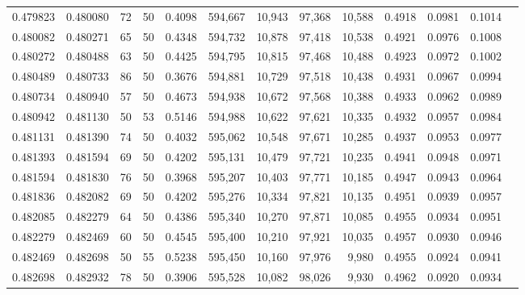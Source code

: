 \begin{tabular}{rrrrrrrrrrrrr}
0.479823 & 0.480080 &    72 &  50 &                                     0.4098 & 594,667 &  10,943 &  97,368 &  10,588 & 0.4918 & 0.0981 & 0.1014 \\
0.480082 & 0.480271 &    65 &  50 &                                     0.4348 & 594,732 &  10,878 &  97,418 &  10,538 & 0.4921 & 0.0976 & 0.1008 \\
0.480272 & 0.480488 &    63 &  50 &                                     0.4425 & 594,795 &  10,815 &  97,468 &  10,488 & 0.4923 & 0.0972 & 0.1002 \\
0.480489 & 0.480733 &    86 &  50 &                                     0.3676 & 594,881 &  10,729 &  97,518 &  10,438 & 0.4931 & 0.0967 & 0.0994 \\
0.480734 & 0.480940 &    57 &  50 &                                     0.4673 & 594,938 &  10,672 &  97,568 &  10,388 & 0.4933 & 0.0962 & 0.0989 \\
0.480942 & 0.481130 &    50 &  53 &                                     0.5146 & 594,988 &  10,622 &  97,621 &  10,335 & 0.4932 & 0.0957 & 0.0984 \\
0.481131 & 0.481390 &    74 &  50 &                                     0.4032 & 595,062 &  10,548 &  97,671 &  10,285 & 0.4937 & 0.0953 & 0.0977 \\
0.481393 & 0.481594 &    69 &  50 &                                     0.4202 & 595,131 &  10,479 &  97,721 &  10,235 & 0.4941 & 0.0948 & 0.0971 \\
0.481594 & 0.481830 &    76 &  50 &                                     0.3968 & 595,207 &  10,403 &  97,771 &  10,185 & 0.4947 & 0.0943 & 0.0964 \\
0.481836 & 0.482082 &    69 &  50 &                                     0.4202 & 595,276 &  10,334 &  97,821 &  10,135 & 0.4951 & 0.0939 & 0.0957 \\
0.482085 & 0.482279 &    64 &  50 &                                     0.4386 & 595,340 &  10,270 &  97,871 &  10,085 & 0.4955 & 0.0934 & 0.0951 \\
0.482279 & 0.482469 &    60 &  50 &                                     0.4545 & 595,400 &  10,210 &  97,921 &  10,035 & 0.4957 & 0.0930 & 0.0946 \\
0.482469 & 0.482698 &    50 &  55 &                                     0.5238 & 595,450 &  10,160 &  97,976 &   9,980 & 0.4955 & 0.0924 & 0.0941 \\
0.482698 & 0.482932 &    78 &  50 &                                     0.3906 & 595,528 &  10,082 &  98,026 &   9,930 & 0.4962 & 0.0920 & 0.0934 \\

\end{tabular}
